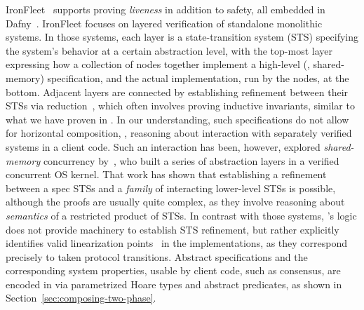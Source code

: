 IronFleet~\cite{Hawblitzel-al:SOSP15} supports proving \emph{liveness}
in addition to safety, all embedded in Dafny~\cite{Leino:LPAR10}.
%
%
IronFleet focuses on layered verification of standalone monolithic
systems.
%
In those systems, each layer is a state-transition system (STS)
specifying the system's behavior at a certain abstraction level, with
the top-most layer expressing how a collection of nodes together
implement a high-level (\eg, shared-memory) specification,
%
and the actual implementation, run by the nodes, at the bottom.
%
Adjacent layers are connected by establishing refinement between
their %
STSs via reduction~\cite{Lipton-CACM75}, which often involves proving
inductive invariants, similar to what we have proven in \disel.
%
%
In our understanding, such specifications do not allow for horizontal
composition, \ie, reasoning about interaction with separately verified
systems in a client code.
%
Such an interaction has been, however, explored \wrt
\emph{shared-memory} concurrency by~\citet{Gu-al:OSDI16}, who built a
series of abstraction layers in a verified concurrent OS kernel. That
work has shown that establishing a refinement between a spec STSs and
a \emph{family} of interacting lower-level STSs is possible, although
the proofs are usually quite complex, as they involve reasoning about
\emph{semantics} of a restricted product of STSs.
%
In contrast with those systems, \disel's logic does not provide
machinery to establish STS refinement, but rather explicitly
identifies valid linearization points~\cite{Herlihy-Wing:TOPLAS90} in
the implementations, as they correspond precisely to taken protocol
transitions.
%
Abstract specifications and the corresponding system properties, usable
by client code, such as consensus, are encoded in \disel via
parametrized Hoare types and abstract predicates, as shown in
Section~\ref{sec:composing-two-phase}.

